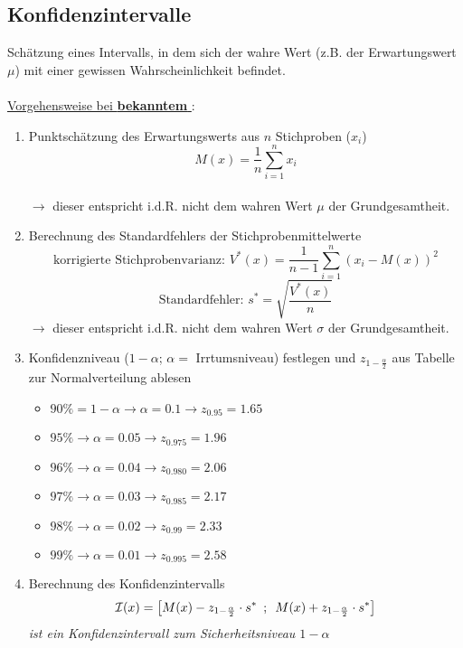 \subsection{Konfidenzintervalle}

Schätzung eines Intervalls, in dem sich der wahre Wert (z.B. der Erwartungswert~\(\mu\)) mit einer gewissen Wahrscheinlichkeit befindet.
\\\\
\underline{Vorgehensweise bei \textbf{bekanntem} \boldmath{\(\sigma\)}}:
\begin{enumerate}
    \item Punktschätzung des Erwartungswerts aus \(n\) Stichproben (\(x_i\))
            \[M(x)=\frac{1}{n}\sum_{i=1}^{n}x_i\]\\
            \(\rightarrow\) dieser entspricht i.d.R. nicht dem wahren Wert \(\mu\) der Grundgesamtheit.
    \item Berechnung des Standardfehlers der Stichprobenmittelwerte
            \[\text{korrigierte Stichprobenvarianz: }V^*(x)=\frac{1}{n-1}\sum_{i=1}^{n}(x_i-M(x))^2\]
            \[\text{Standardfehler: }s^*=\sqrt{\frac{V^*(x)}{n}}\]
            \(\rightarrow\) dieser entspricht i.d.R. nicht dem wahren Wert \(\sigma\) der Grundgesamtheit.
    \item Konfidenzniveau (\(1-\alpha\); \(\alpha=\) Irrtumsniveau) festlegen und \(z_{1-\frac{\alpha}{2}}\) aus Tabelle zur Normalverteilung ablesen
        \begin{itemize}
            \item \(90\% = 1-\alpha \rightarrow \alpha=0.1\rightarrow z_{0.95}=1.65\)
            \item \(95\% \rightarrow \alpha=0.05\rightarrow z_{0.975}=1.96\)
            \item \(96\% \rightarrow \alpha=0.04\rightarrow z_{0.980}=2.06\)
            \item \(97\% \rightarrow \alpha=0.03\rightarrow z_{0.985}=2.17\)
            \item \(98\% \rightarrow \alpha=0.02\rightarrow z_{0.99}=2.33\)
            \item \(99\% \rightarrow \alpha=0.01\rightarrow z_{0.995}=2.58\)
        \end{itemize}
    \item Berechnung des Konfidenzintervalls
    \begin{equation*}
        \mathcal{I}(x) = \left[M(x) - z_{1-\frac{\alpha}{2}} \cdot s^*\hspace{0.5em}; \hspace{0.5em}M(x) + z_{1-\frac{\alpha}{2}} \cdot s^*\right]
    \end{equation*}
    \emph{ist ein Konfidenzintervall zum Sicherheitsniveau \(1-\alpha\)}\\
\end{enumerate}

